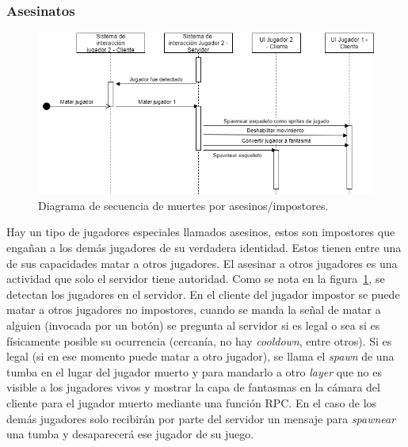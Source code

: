 \subsubsection{Asesinatos}
\begin{figure}[H]
    \centering
    \includegraphics[width=1\linewidth]{images/diagrama_sec_matar.png}
    \caption{Diagrama de secuencia de muertes por asesinos/impostores.}
    \label{fig:diagrama_sec_muertes_por_impost}
\end{figure}
Hay un tipo de jugadores especiales llamados asesinos, estos son impostores que engañan a los demás jugadores de su verdadera identidad. Estos tienen entre una de sus capacidades matar a otros jugadores. El asesinar a otros jugadores es una actividad que solo el servidor tiene autoridad.
Como se nota en la figura~\ref{fig:diagrama_sec_muertes_por_impost}, se detectan los jugadores en el servidor. En el cliente del jugador impostor se puede matar a otros jugadores no impostores, cuando se manda la señal de matar a alguien (invocada por un botón) se pregunta al servidor si es legal o sea si es físicamente posible su ocurrencia (cercanía, no hay \textit{cooldown}, entre otros). Si es legal (si en ese momento puede matar a otro jugador), se llama el \textit{spawn} de una tumba en el lugar del jugador muerto y para mandarlo a otro \textit{layer} que no es visible a los jugadores vivos y mostrar la capa de fantasmas en la cámara del cliente para el jugador muerto mediante una función RPC. En el caso de los demás jugadores solo recibirán por parte del servidor un mensaje para \textit{spawnear} una tumba y desaparecerá ese jugador de su juego.

